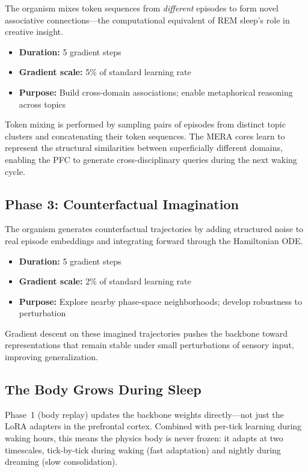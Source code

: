 \documentclass[11pt,a4paper,twocolumn]{article}
\begin{document}
The organism mixes token sequences from \emph{different} episodes to form novel associative connections---the computational equivalent of REM sleep's role in creative insight.
\begin{itemize}
\item \textbf{Duration:} 5 gradient steps
\item \textbf{Gradient scale:} 5\% of standard learning rate
\item \textbf{Purpose:} Build cross-domain associations; enable metaphorical reasoning across topics
\end{itemize}
Token mixing is performed by sampling pairs of episodes from distinct topic clusters and concatenating their token sequences.
The MERA cores learn to represent the structural similarities between superficially different domains, enabling the PFC to generate cross-disciplinary queries during the next waking cycle.

\subsection{Phase 3: Counterfactual Imagination}

The organism generates counterfactual trajectories by adding structured noise to real episode embeddings and integrating forward through the Hamiltonian ODE.
\begin{itemize}
\item \textbf{Duration:} 5 gradient steps
\item \textbf{Gradient scale:} 2\% of standard learning rate
\item \textbf{Purpose:} Explore nearby phase-space neighborhoods; develop robustness to perturbation
\end{itemize}
Gradient descent on these imagined trajectories pushes the backbone toward representations that remain stable under small perturbations of sensory input, improving generalization.

\subsection{The Body Grows During Sleep}

Phase~1 (body replay) updates the backbone weights directly---not just the LoRA adapters in the prefrontal cortex.
Combined with per-tick learning during waking hours, this means the physics body is never frozen: it adapts at two timescales, tick-by-tick during waking (fast adaptation) and nightly during dreaming (slow consolidation).
\end{document}
